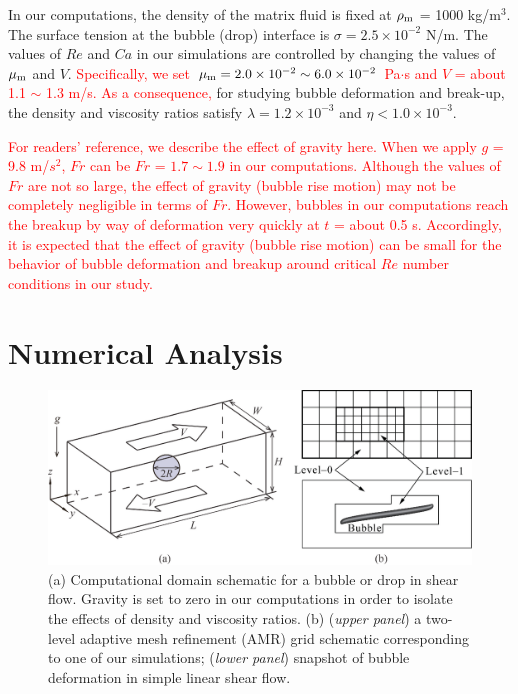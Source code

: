 \documentclass{elsarticle}
\begin{document}
\par
In our computations, the density of the matrix fluid is fixed at $\rho_{\rm m}$ = 1000 kg/m$^3$.  The surface tension at the bubble (drop) interface is $\sigma =2.5 \times 10^{-2}$ N/m. The values of $Re$ and $Ca$ in our simulations are controlled by changing the values of $\mu_{\rm m}$ and $V$.  
\textcolor{red}
{
Specifically, we set $\mu_{\rm m} = 2.0 \times 10^{-2} \sim 6.0 \times 10^{-2}$ Pa$\cdot$s and
$V$ = about 1.1 $\sim$ 1.3 m/s.
As a consequence, 
}
for studying bubble deformation and break-up, the density and viscosity ratios satisfy
$\lambda = 1.2 \times 10^{-3}$ and $\eta < 1.0 \times 10^{-3}$.
\par
\textcolor{red}
{
For readers’ reference, we describe the effect of gravity here. When we apply $g$ = 9.8 m/$s^{2}$,  $Fr$  can be $Fr$ = $1.7 \sim 1.9$ in our computations.  Although the values of $Fr$ are not so large, the effect of gravity (bubble rise motion) may not be completely negligible in terms of $Fr$.  However, bubbles in our computations reach the breakup by way of deformation very quickly at $t$ = about 0.5 s.  Accordingly, it is expected that the effect of gravity (bubble rise motion) can be small for the behavior of bubble deformation and breakup around critical $Re$ number conditions in our study.  }
\section{Numerical Analysis}
% 
\begin{figure}%
  \centering
  \includegraphics[scale=0.4]{Figure/1-SchematicAndGrid}
  \caption{(a) Computational domain schematic for a bubble or drop in shear 
           flow.  Gravity is set to zero in our computations in order to isolate
           the effects of density and viscosity ratios.  
           (b) (\textit{upper panel}) a two-level adaptive mesh 
           refinement (AMR) grid schematic corresponding to one of our
           simulations;
           (\textit{lower panel}) snapshot of bubble deformation 
           in simple linear shear flow.}
  \label{fig:SchemAndGrid}
\end{figure}
%
\end{document}
